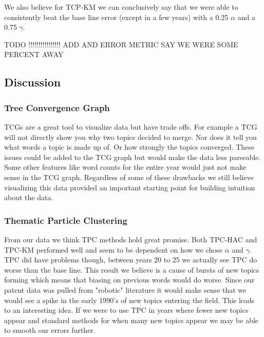 \documentclass[conference]{IEEEtran}
\begin{document}
We also believe for TCP-KM we can conclusively say that we were able to consistently beat the base line error (except in a few years) with a 0.25 $\alpha$ and a 0.75 $\gamma$.

TODO !!!!!!!!!!!!!!!! ADD AND ERROR METRIC SAY WE WERE SOME PERCENT AWAY 

\subsection{Discussion}

\subsubsection{Tree Convergence Graph}
TCGs are a great tool to visualize data but have trade offs. For example a TCG will not directly show you why two topics decided to merge. Nor does it tell you what words a topic is made up of. Or how strongly the topics converged. These issues could be added to the TCG graph but would make the data less parseable. Some other features like word counts for the entire year would just not make sense in the TCG graph. Regardless of some of these drawbacks we still believe visualizing this data provided an important starting point for building intuition about the data.

\subsubsection{Thematic Particle Clustering}
From our data we think TPC methods hold great promise. Both TPC-HAC and TPC-KM performed well and seem to be dependent on how we chose $\alpha$ and $\gamma$. TPC did have problems though, between years 20 to 25 we actually see TPC do worse than the base line. This result we believe is a cause of bursts of new topics forming which means that biasing on previous words would do worse. Since our patent data was pulled from "robotic" literature it would make sense that we would see a spike in the early 1990's of new topics entering the field. This leads to an interesting idea. If we were to use TPC in years where fewer new topics appear and standard methods for when many new topics appear we may be able to smooth our errors further. 


\end{document}
